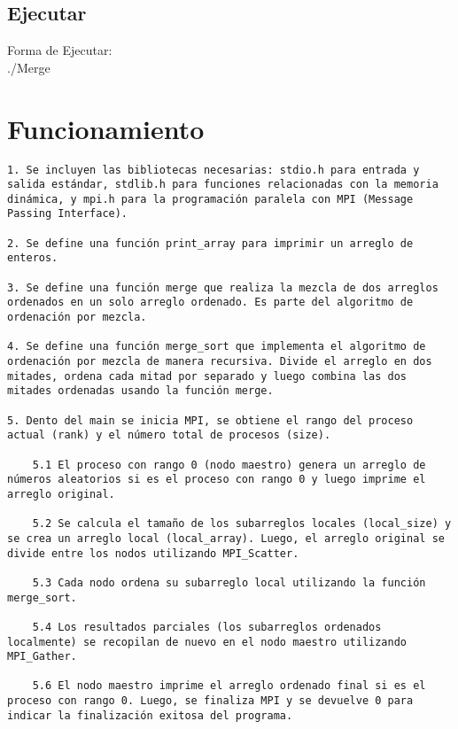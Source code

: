 \documentclass[a4paper,12pt]{article}
\begin{document}
\subsection*{Ejecutar}
\begin{center}
    Forma de Ejecutar:\\
    ./Merge
\end{center}

\section*{Funcionamiento}
\begin{verbatim}
1. Se incluyen las bibliotecas necesarias: stdio.h para entrada y salida estándar, stdlib.h para funciones relacionadas con la memoria dinámica, y mpi.h para la programación paralela con MPI (Message Passing Interface).

2. Se define una función print_array para imprimir un arreglo de enteros.

3. Se define una función merge que realiza la mezcla de dos arreglos ordenados en un solo arreglo ordenado. Es parte del algoritmo de ordenación por mezcla.

4. Se define una función merge_sort que implementa el algoritmo de ordenación por mezcla de manera recursiva. Divide el arreglo en dos mitades, ordena cada mitad por separado y luego combina las dos mitades ordenadas usando la función merge.

5. Dento del main se inicia MPI, se obtiene el rango del proceso actual (rank) y el número total de procesos (size).
    
    5.1 El proceso con rango 0 (nodo maestro) genera un arreglo de números aleatorios si es el proceso con rango 0 y luego imprime el arreglo original.
    
    5.2 Se calcula el tamaño de los subarreglos locales (local_size) y se crea un arreglo local (local_array). Luego, el arreglo original se divide entre los nodos utilizando MPI_Scatter.
    
    5.3 Cada nodo ordena su subarreglo local utilizando la función merge_sort.

    5.4 Los resultados parciales (los subarreglos ordenados localmente) se recopilan de nuevo en el nodo maestro utilizando MPI_Gather.

    5.6 El nodo maestro imprime el arreglo ordenado final si es el proceso con rango 0. Luego, se finaliza MPI y se devuelve 0 para indicar la finalización exitosa del programa. 

\end{verbatim}
\end{document}
